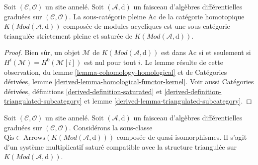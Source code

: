 \begin{lemma}
\label{lemma-acyclics}
Soit $(\mathcal{C}, \mathcal{O})$ un site annelé. Soit
$(\mathcal{A}, \text{d})$ un faisceau d'algèbres différentielles graduées
sur $(\mathcal{C}, \mathcal{O})$. La sous-catégorie pleine $\text{Ac}$
de la catégorie homotopique $K(\textit{Mod}(\mathcal{A}, \text{d}))$
composée de modules acycliques est une sous-catégorie triangulée
strictement pleine et saturée de $K(\textit{Mod}(\mathcal{A}, \text{d}))$.
\end{lemma}

\begin{proof}
Bien sûr, un objet $\mathcal{M}$ de $K(\textit{Mod}(\mathcal{A}, \text{d}))$ est
dans $\text{Ac}$ si et seulement si $H^i(\mathcal{M}) = H^0(\mathcal{M}[i])$ est
nul pour tout $i$. Le lemme résulte de cette
observation, du lemme \ref{lemma-cohomology-homological}
et de Catégories dérivées, lemme \ref{derived-lemma-homological-functor-kernel}.
Voir aussi Catégories dérivées, définitions \ref{derived-definition-saturated}
et \ref{derived-definition-triangulated-subcategory}
et lemme \ref{derived-lemma-triangulated-subcategory}.
\end{proof}

\begin{lemma}
\label{lemma-qis}
Soit $(\mathcal{C}, \mathcal{O})$ un site annelé. Soit
$(\mathcal{A}, \text{d})$ un faisceau d'algèbres différentielles graduées
sur $(\mathcal{C}, \mathcal{O})$.
Considérons la
sous-classe $\text{Qis} \subset \text{Arrows}(K(\textit{Mod}(\mathcal{A}, \text{d})))$
composée de quasi-isomorphismes. Il s'agit d'un système multiplicatif
saturé compatible avec la structure triangulée sur
$K(\textit{Mod}(\mathcal{A}, \text{d}))$.
\end{lemma}

